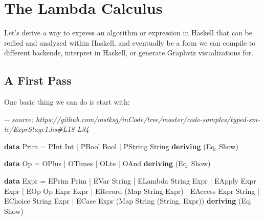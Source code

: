 \documentclass[]{article}
\newenvironment{Shaded}{}{}
\newcommand{\CommentTok}[1]{\textcolor[rgb]{0.38,0.63,0.69}{\textit{#1}}}
\newcommand{\DataTypeTok}[1]{\textcolor[rgb]{0.56,0.13,0.00}{#1}}
\newcommand{\KeywordTok}[1]{\textcolor[rgb]{0.00,0.44,0.13}{\textbf{#1}}}
\newcommand{\NormalTok}[1]{#1}
\newcommand{\OperatorTok}[1]{\textcolor[rgb]{0.40,0.40,0.40}{#1}}
\newcommand{\OtherTok}[1]{\textcolor[rgb]{0.00,0.44,0.13}{#1}}
\begin{document}
\section{The Lambda Calculus}\label{the-lambda-calculus}

Let's derive a way to express an algorithm or expression in Haskell that can be
reified and analyzed within Haskell, and eventually be a form we can compile to
different backends, interpret in Haskell, or generate Graphviz visualizations
for.

\subsection{A First Pass}\label{a-first-pass}

One basic thing we can do is start with:

\begin{Shaded}
\begin{Highlighting}[]
\CommentTok{{-}{-} source: https://github.com/mstksg/inCode/tree/master/code{-}samples/typed{-}sm{-}lc/ExprStage1.hs\#L18{-}L34}

\KeywordTok{data} \DataTypeTok{Prim} \OtherTok{=} \DataTypeTok{PInt} \DataTypeTok{Int} \OperatorTok{|} \DataTypeTok{PBool} \DataTypeTok{Bool} \OperatorTok{|} \DataTypeTok{PString} \DataTypeTok{String}
  \KeywordTok{deriving}\NormalTok{ (}\DataTypeTok{Eq}\NormalTok{, }\DataTypeTok{Show}\NormalTok{)}

\KeywordTok{data} \DataTypeTok{Op} \OtherTok{=} \DataTypeTok{OPlus} \OperatorTok{|} \DataTypeTok{OTimes} \OperatorTok{|} \DataTypeTok{OLte} \OperatorTok{|} \DataTypeTok{OAnd}
  \KeywordTok{deriving}\NormalTok{ (}\DataTypeTok{Eq}\NormalTok{, }\DataTypeTok{Show}\NormalTok{)}

\KeywordTok{data} \DataTypeTok{Expr}
  \OtherTok{=} \DataTypeTok{EPrim} \DataTypeTok{Prim}
  \OperatorTok{|} \DataTypeTok{EVar} \DataTypeTok{String}
  \OperatorTok{|} \DataTypeTok{ELambda} \DataTypeTok{String} \DataTypeTok{Expr}
  \OperatorTok{|} \DataTypeTok{EApply} \DataTypeTok{Expr} \DataTypeTok{Expr}
  \OperatorTok{|} \DataTypeTok{EOp} \DataTypeTok{Op} \DataTypeTok{Expr} \DataTypeTok{Expr}
  \OperatorTok{|} \DataTypeTok{ERecord}\NormalTok{ (}\DataTypeTok{Map} \DataTypeTok{String} \DataTypeTok{Expr}\NormalTok{)}
  \OperatorTok{|} \DataTypeTok{EAccess} \DataTypeTok{Expr} \DataTypeTok{String}
  \OperatorTok{|} \DataTypeTok{EChoice} \DataTypeTok{String} \DataTypeTok{Expr}
  \OperatorTok{|} \DataTypeTok{ECase} \DataTypeTok{Expr}\NormalTok{ (}\DataTypeTok{Map} \DataTypeTok{String}\NormalTok{ (}\DataTypeTok{String}\NormalTok{, }\DataTypeTok{Expr}\NormalTok{))}
  \KeywordTok{deriving}\NormalTok{ (}\DataTypeTok{Eq}\NormalTok{, }\DataTypeTok{Show}\NormalTok{)}
\end{Highlighting}
\end{Shaded}
\end{document}
